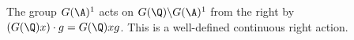 The group $G(\A)^1$ acts on $G(\Q)\backslash G(\A)^1$ from the right by $(G(\Q)x)\cdot g=G(\Q)xg$. This is a well-defined
continuous right action.
